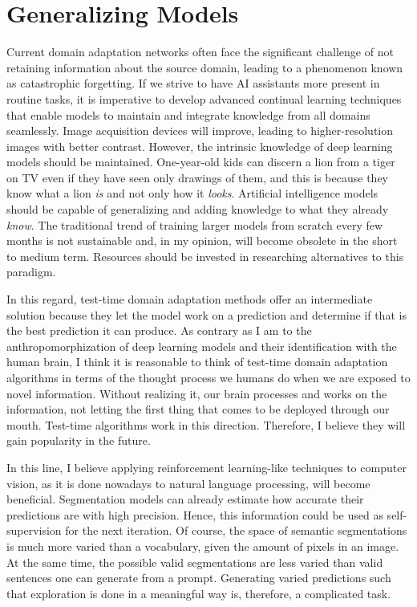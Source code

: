 
\section{Generalizing Models}
Current domain adaptation networks often face the significant challenge of not retaining information about the source domain, leading to a phenomenon known as catastrophic forgetting. If we strive to have AI assistants more present in routine tasks, it is imperative to develop advanced continual learning techniques that enable models to maintain and integrate knowledge from all domains seamlessly. Image acquisition devices will improve, leading to higher-resolution images with better contrast. However, the intrinsic knowledge of deep learning models should be maintained. One-year-old kids can discern a lion from a tiger on TV even if they have seen only drawings of them, and this is because they know what a lion \textit{is} and not only how it \textit{looks}. Artificial intelligence models should be capable of generalizing and adding knowledge to what they already \textit{know}. The traditional trend of training larger models from scratch every few months is not sustainable and, in my opinion, will become obsolete in the short to medium term. Resources should be invested in researching alternatives to this paradigm.

In this regard, test-time domain adaptation methods offer an intermediate solution because they let the model work on a prediction and determine if that is the best prediction it can produce. As contrary as I am to the anthropomorphization of deep learning models and their identification with the human brain, I think it is reasonable to think of test-time domain adaptation algorithms in terms of the thought process we humans do when we are exposed to novel information. Without realizing it, our brain processes and works on the information, not letting the first thing that comes to be deployed through our mouth. Test-time algorithms work in this direction. Therefore, I believe they will gain popularity in the future.

In this line, I believe applying reinforcement learning-like techniques to computer vision, as it is done nowadays to natural language processing, will become beneficial. Segmentation models can already estimate how accurate their predictions are with high precision. Hence, this information could be used as self-supervision for the next iteration. Of course, the space of semantic segmentations is much more varied than a vocabulary, given the amount of pixels in an image. At the same time, the possible valid segmentations are less varied than valid sentences one can generate from a prompt. Generating varied predictions such that exploration is done in a meaningful way is, therefore, a complicated task. 